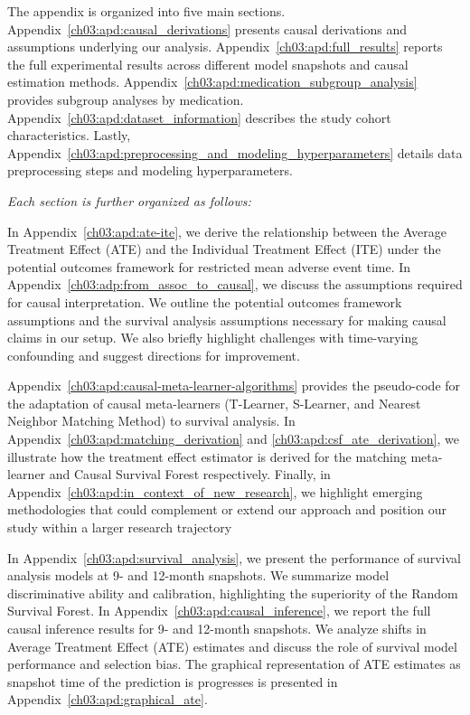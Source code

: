 
\label{ch03:apd:outline}
The appendix is organized into five main sections.
Appendix~\ref{ch03:apd:causal_derivations} presents causal derivations and assumptions underlying our analysis.
Appendix~\ref{ch03:apd:full_results} reports the full experimental results across different model snapshots and causal estimation methods.
Appendix~\ref{ch03:apd:medication_subgroup_analysis} provides subgroup analyses by medication.
Appendix~\ref{ch03:apd:dataset_information} describes the study cohort characteristics.
Lastly, Appendix~\ref{ch03:apd:preprocessing_and_modeling_hyperparameters} details data preprocessing steps and modeling hyperparameters.

\noindent\emph{Each section is further organized as follows:}

In Appendix~\ref{ch03:apd:ate-ite}, we derive the relationship between the Average Treatment Effect (ATE) and the Individual Treatment Effect (ITE) under the potential outcomes framework for restricted mean adverse event time.
In Appendix~\ref{ch03:adp:from_assoc_to_causal}, we discuss the assumptions required for causal interpretation.
We outline the potential outcomes framework assumptions and the survival analysis assumptions necessary for making causal claims in our setup.
We also briefly highlight challenges with time-varying confounding and suggest directions for improvement.  

Appendix~\ref{ch03:apd:causal-meta-learner-algorithms} provides the pseudo-code for the adaptation of causal meta-learners (T-Learner, S-Learner, and Nearest Neighbor Matching Method) to survival analysis.
In Appendix~\ref{ch03:apd:matching_derivation} and \ref{ch03:apd:csf_ate_derivation}, we illustrate how the treatment effect estimator is derived for the matching meta-learner and Causal Survival Forest respectively. 
Finally, in Appendix~\ref{ch03:apd:in_context_of_new_research}, we highlight emerging methodologies that could complement or extend our approach and position our study within a larger research trajectory 

In Appendix~\ref{ch03:apd:survival_analysis}, we present the performance of survival analysis models at 9- and 12-month snapshots.  
We summarize model discriminative ability and calibration, highlighting the superiority of the Random Survival Forest.  
In Appendix~\ref{ch03:apd:causal_inference}, we report the full causal inference results for 9- and 12-month snapshots.  
We analyze shifts in Average Treatment Effect (ATE) estimates and discuss the role of survival model performance and selection bias. 
The graphical representation of ATE estimates as snapshot time of the prediction is progresses is presented in Appendix~\ref{ch03:apd:graphical_ate}.

